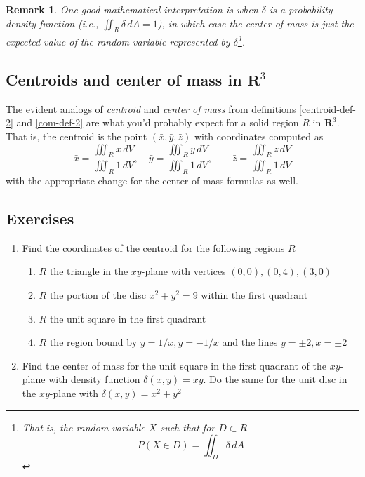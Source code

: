 \documentclass[12pt]{article}
\numberwithin{equation}{subsection}
\numberwithin{figure}{subsection}
\theoremstyle{note}
\newtheorem{remark}[subsection]{Remark}
\begin{document}
{\begin{remark}One good mathematical interpretation is when $\delta$ is a probability density function (i.e., $\iint_R \delta\,dA=1$), in which case the center of mass is just the \textit{expected value} of the random variable represented by $\delta$\footnote{That is, the random variable $X$ such that for  $D\subset R$ \[P(X\in D)= \iint_D \delta \,dA\]}. \end{remark}

\subsection{Centroids and center of mass in $\mathbf{R}^3$}
The evident analogs of \textit{centroid} and \textit{center of mass} from definitions \ref{centroid-def-2} and \ref{com-def-2} are what you'd probably expect for a solid region $R$ in $\mathbf{R}^3$. That is, the centroid is the point $(\bar{x},\bar{y},\bar{z})$ with coordinates computed as \begin{equation} \bar{x} =\dfrac{\iiint_R x\,dV}{\iiint_R 1\,dV}, \quad \bar{y} =\dfrac{\iiint_R y\,dV}{\iiint_R 1\,dV}, \qquad \bar{z} =\dfrac{\iiint_R z\,dV}{\iiint_R 1\,dV} \end{equation}
with the appropriate change for the center of mass formulas as well. 

\subsection{Exercises}
\begin{enumerate}[label=\arabic*.]
\item Find the coordinates of the centroid for the following regions $R$

\begin{enumerate}
	\item $R$ the triangle in the $xy$-plane with vertices $(0,0), (0,4), (3,0)$ 
	\item $R$ the portion of the disc $x^2+y^2=9$ within the first quadrant
	\item $R$ the unit square in the first quadrant
	\item $R$ the region bound by $y=1/x, y=-1/x$ and the lines $y=\pm 2, x=\pm 2$
\end{enumerate}
\item  Find the center of mass for the unit square in the first quadrant of the $xy$-plane with density function $\delta(x,y)=xy$. Do the same for the unit disc in the $xy$-plane with $\delta(x,y)=x^2+y^2$


\end{enumerate}}
\end{document}
